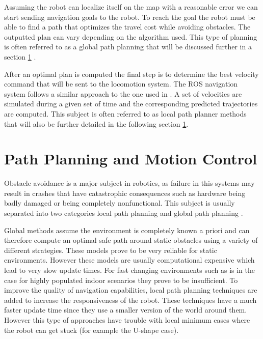 Assuming the robot can localize itself on the map with a reasonable error we can start sending navigation goals to the robot. To reach the goal the robot must be able to find a path that optimizes the travel cost while avoiding obstacles. The outputted plan can vary depending on the algorithm used. This type of planning is often referred to as a global path planning that will be discussed further in a section \ref{ppmc} .

After an optimal plan is computed the final step is to determine the best velocity command that will be sent to the locomotion system.  The ROS navigation system follows a similar approach to the one used in \cite{gerkey2008planning}. A set of velocities are simulated during a given set of time and the corresponding predicted trajectories are  computed. This subject is often referred to as local path planner methods that will also be further detailed in the following section \ref{ppmc}.


\section{Path Planning and Motion Control}\label{ppmc}
 Obstacle avoidance is a major subject in robotics, as failure in this systems may result in crashes that have catastrophic consequences such as hardware being badly damaged or being completely nonfunctional. This subject is usually separated into two categories local path planning and global path planning \cite{foxdwa}.
 
 
 Global methods assume the environment is completely known a priori and can therefore compute an optimal safe path  around static obstacles using a variety of different strategies. These models prove to be very reliable for static environments. However these models are usually computational expensive which lead to very slow update times. For fast changing environments such as is in the case for highly populated indoor scenarios they prove to be insufficient. 
 To improve the quality of navigation capabilities, local path planning techniques are added to increase the responsiveness of the robot. These techniques have a much faster update time  since they use a smaller version of the world around them. However this type of approaches have trouble with local minimum cases where the robot can get stuck (for example the U-shape case).
